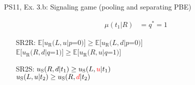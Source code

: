 \begin{frame}{PS11, Ex. 3.b: Signaling game (pooling and separating PBE)}
\begin{multicols}{2}
\begin{itemize}
\begin{align*}
          \mu(t_1|R)&=q^*=1
        \end{align*}
        \item[SR2R:] \vspace{-6pt}
                     $\mathbb{E}[u_\text{R}(L,u|p$=$0)]\geq\mathbb{E}[u_\text{R}(L,d|p$=$0)]$\\
                     $\mathbb{E}[u_\text{R}(R,d|q$=$1)]\geq \mathbb{E}[u_\text{R}(R,u|q$=$1)]$
        \item[SR2S:] $u_\text{S}(R,d|t_1)\geq u_\text{S}(L,\textcolor{red}{u}|t_1)$\\
                     $u_\text{S}(L,u|t_2)\geq u_\text{S}(R,\textcolor{red}{d}|t_2)$
      \end{itemize}
      \vfill\null \columnbreak
      \vfill
    \end{multicols}
\end{frame}
